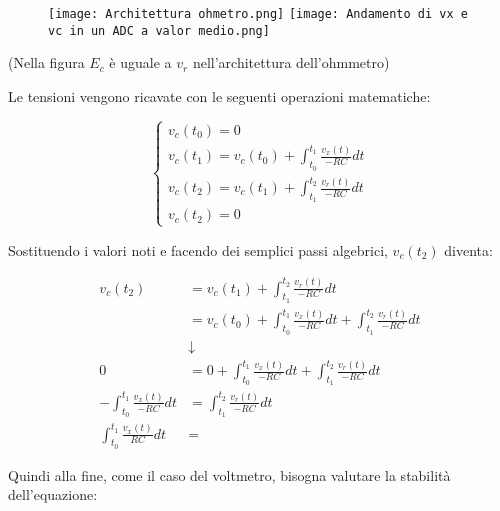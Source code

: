 \begin{figure}[h]
    \centering
    \texttt{[image: Architettura ohmetro.png]}
    \texttt{[image: Andamento di vx e vc in un ADC a valor medio.png]}
\end{figure}

(Nella figura $E_c$ è uguale a $v_r$ nell'architettura dell'ohmmetro) \newline 

Le tensioni vengono ricavate con le seguenti operazioni matematiche: 

{
    \Large 
    \begin{equation}
        \begin{cases}
            v_c (t_0) = 0
            \\
            v_c (t_1) = v_c (t_0) + \int_{t_0}^{t_1} \frac{v_x (t)}{- RC} dt 
            \\
            v_c (t_2) = v_c (t_1) + \int_{t_1}^{t_2} \frac{v_r (t)}{- RC} dt
            \\ 
            v_c (t_2) = 0
        \end{cases}
    \end{equation}
}

Sostituendo i valori noti e facendo dei semplici passi algebrici, 
$v_c (t_2)$ diventa: 

{
    \Large 
    \begin{equation}
        \begin{split}
            v_c (t_2) &= v_c (t_1) + \int_{t_1}^{t_2} \frac{v_r (t)}{- RC} dt
            \\
            & = v_c (t_0) + \int_{t_0}^{t_1} \frac{v_x (t)}{- RC} dt + \int_{t_1}^{t_2} \frac{v_r (t)}{- RC} dt
            \\
            &\downarrow
            \\
            0 &= 0 + \int_{t_0}^{t_1} \frac{v_x (t)}{- RC} dt + \int_{t_1}^{t_2} \frac{v_r (t)}{- RC} dt
            \\
            - \int_{t_0}^{t_1} \frac{v_x (t)}{- RC} dt 
            &=
            \int_{t_1}^{t_2} \frac{v_r (t)}{- RC} dt
            \\
            \int_{t_0}^{t_1} \frac{v_x (t)}{RC} dt 
            &=
        \end{split}
    \end{equation}
}

Quindi alla fine, come il caso del voltmetro, bisogna valutare la stabilità dell'equazione: 

